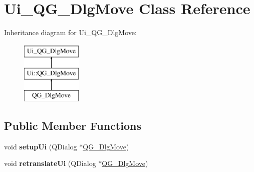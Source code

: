 \hypertarget{classUi__QG__DlgMove}{\section{Ui\-\_\-\-Q\-G\-\_\-\-Dlg\-Move Class Reference}
\label{classUi__QG__DlgMove}
}
Inheritance diagram for Ui\-\_\-\-Q\-G\-\_\-\-Dlg\-Move\-:\begin{figure}[H]
\begin{center}
\leavevmode
\includegraphics[height=3.000000cm]{classUi__QG__DlgMove}
\end{center}
\end{figure}
\subsection*{Public Member Functions}
\begin{DoxyCompactItemize}
\item 
\hypertarget{classUi__QG__DlgMove_a8a5aa6f29f9a889cf048dbf7acf06750}{void {\bfseries setup\-Ui} (Q\-Dialog $\ast$\hyperlink{classQG__DlgMove}{Q\-G\-\_\-\-Dlg\-Move})}\label{classUi__QG__DlgMove_a8a5aa6f29f9a889cf048dbf7acf06750}

\item 
\hypertarget{classUi__QG__DlgMove_a8c0bc6205759fddff002d3b2de692e2b}{void {\bfseries retranslate\-Ui} (Q\-Dialog $\ast$\hyperlink{classQG__DlgMove}{Q\-G\-\_\-\-Dlg\-Move})}\label{classUi__QG__DlgMove_a8c0bc6205759fddff002d3b2de692e2b}

\end{DoxyCompactItemize}
